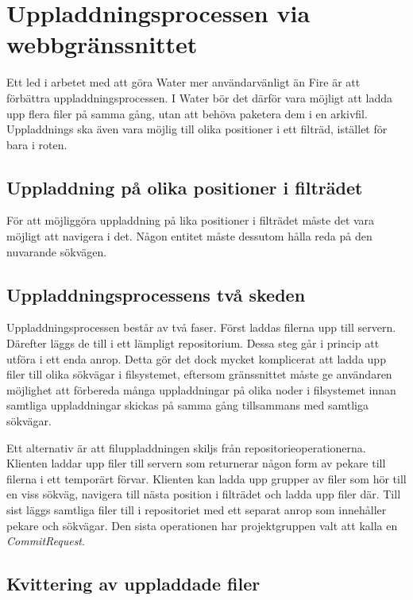 \section{Uppladdningsprocessen via webbgränssnittet}

Ett led i arbetet med att göra Water mer användarvänligt än Fire är att förbättra uppladdningsprocessen. I Water bör det därför vara möjligt att ladda upp flera filer på samma gång, utan att behöva paketera dem i en arkivfil. Uppladdnings ska även vara möjlig till olika positioner i ett filträd, istället för bara i roten.

\subsection{Uppladdning på olika positioner i filträdet}

För att möjliggöra uppladdning på lika positioner i filträdet måste det vara möjligt att navigera i det. Någon entitet måste dessutom hålla reda på den nuvarande sökvägen.

\subsection{Uppladdningsprocessens två skeden}
Uppladdningsprocessen består av två faser. Först laddas filerna upp till servern. Därefter läggs de till i ett lämpligt repositorium. Dessa steg går i princip att utföra i ett enda anrop. Detta gör det dock mycket komplicerat att ladda upp filer till olika sökvägar i filsystemet, eftersom gränssnittet  måste ge användaren möjlighet att förbereda många uppladdningar på olika noder i filsystemet innan samtliga uppladdningar skickas på samma gång tillsammans med samtliga sökvägar.

Ett alternativ är att filuppladdningen skiljs från repositorieoperationerna. Klienten laddar upp filer till servern som returnerar någon form av pekare till filerna i ett temporärt förvar. Klienten kan ladda upp grupper av filer som hör till en viss sökväg, navigera till nästa position i filträdet och ladda upp filer där. Till sist läggs samtliga filer till i repositoriet med ett separat anrop som innehåller pekare och sökvägar. Den sista operationen har projektgruppen valt att kalla en \emph{CommitRequest}.

\subsection{Kvittering av uppladdade filer}

